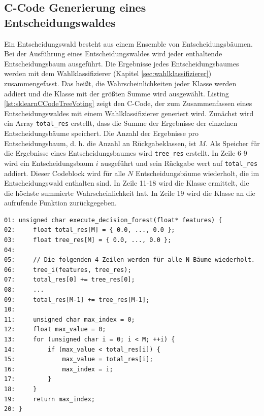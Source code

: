 \subsection{C-Code Generierung eines Entscheidungswaldes}
Ein Entscheidungswald besteht aus einem Ensemble von Entscheidungsbäumen. Bei der Ausführung eines Entscheidungswaldes wird jeder enthaltende Entscheidungsbaum ausgeführt. Die Ergebnisse jedes
Entscheidungsbaumes werden mit dem Wahlklassifizierer (Kapitel \ref{sec:wahlklassifizierer}) zusammengefasst. Das heißt, die Wahrscheinlichkeiten jeder Klasse werden addiert und die Klasse mit
der größten Summe wird ausgewählt.
\newline
\newline
Listing \ref{lst:sklearnCCodeTreeVoting} zeigt den C-Code, der zum Zusammenfassen eines Entscheidungswaldes mit einem Wahlklassifizierer generiert wird. Zunächst wird ein
Array \texttt{total\_res} erstellt, dass die Summe der Ergebnisse der einzelnen Entscheidungsbäume speichert. Die Anzahl der Ergebnisse pro Entscheidungsbaum, d. h. die Anzahl an Rückgabeklassen, ist $M$.
Als Speicher für die Ergebnisse eines Entscheidungsbaumes wird \texttt{tree\_res} erstellt. In Zeile 6-9 wird ein Entscheidungsbaum $i$ ausgeführt und sein Rückgabe wert auf \texttt{total\_res} addiert.
Dieser Codeblock wird für alle $N$ Entscheidungsbäume wiederholt, die im Entscheidungswald enthalten sind. In Zeile 11-18 wird die Klasse ermittelt, die die höchste summierte Wahrscheinlichkeit hat.
In Zeile 19 wird die Klasse an die aufrufende Funktion zurückgegeben.
\begin{lstlisting}[label=lst:sklearnCCodeTreeVoting,caption={C-Code des Wahlklassifizierers mit $M$ Klassen und $N$ Bäumen.}]
01: unsigned char execute_decision_forest(float* features) {
02:     float total_res[M] = { 0.0, ..., 0.0 };
03:     float tree_res[M] = { 0.0, ..., 0.0 };
04:
05:     // Die folgenden 4 Zeilen werden für alle N Bäume wiederholt.
06:     tree_i(features, tree_res);
07:     total_res[0] += tree_res[0];
08:     ...
09:     total_res[M-1] += tree_res[M-1];
10:
11:     unsigned char max_index = 0;
12:     float max_value = 0;
13:     for (unsigned char i = 0; i < M; ++i) {
14:         if (max_value < total_res[i]) {
15:             max_value = total_res[i];
16:             max_index = i;
17:         }
18:     }
19:     return max_index;
20: }
\end{lstlisting}